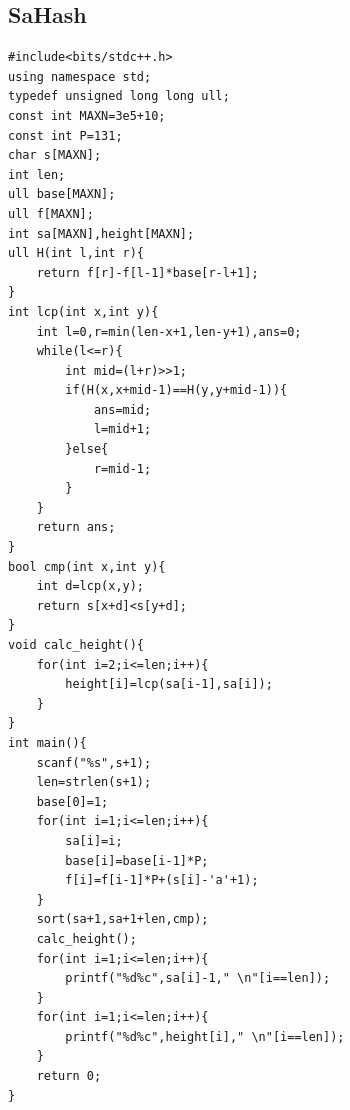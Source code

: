 \documentclass[twoside]{article}
\begin{document}
\subsection{SaHash}
\begin{lstlisting}
#include<bits/stdc++.h>
using namespace std;
typedef unsigned long long ull;
const int MAXN=3e5+10;
const int P=131;
char s[MAXN];
int len;
ull base[MAXN];
ull f[MAXN];
int sa[MAXN],height[MAXN];
ull H(int l,int r){
    return f[r]-f[l-1]*base[r-l+1];
}
int lcp(int x,int y){
    int l=0,r=min(len-x+1,len-y+1),ans=0;
    while(l<=r){
        int mid=(l+r)>>1;
        if(H(x,x+mid-1)==H(y,y+mid-1)){
            ans=mid;
            l=mid+1;
        }else{
            r=mid-1;
        }
    }
    return ans;
}
bool cmp(int x,int y){
    int d=lcp(x,y);
    return s[x+d]<s[y+d];
}
void calc_height(){
    for(int i=2;i<=len;i++){
        height[i]=lcp(sa[i-1],sa[i]);
    }
}
int main(){
    scanf("%s",s+1);
    len=strlen(s+1);
    base[0]=1;
    for(int i=1;i<=len;i++){
        sa[i]=i;
        base[i]=base[i-1]*P;
        f[i]=f[i-1]*P+(s[i]-'a'+1);
    }
    sort(sa+1,sa+1+len,cmp);
    calc_height();
    for(int i=1;i<=len;i++){
        printf("%d%c",sa[i]-1," \n"[i==len]);
    }
    for(int i=1;i<=len;i++){
        printf("%d%c",height[i]," \n"[i==len]);
    }
    return 0;
}
\end{lstlisting}
\end{document}
